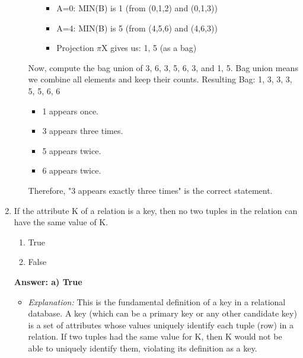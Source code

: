 \documentclass{article}
\begin{document}
\begin{enumerate}[label=\textbf{Question \arabic*.}]
\begin{itemize}
\begin{enumerate}
\begin{itemize}
                        \item A=0: MIN(B) is 1 (from (0,1,2) and (0,1,3))
                        \item A=4: MIN(B) is 5 (from (4,5,6) and (4,6,3))
                    \item Projection $\pi$X gives us: {1, 5} (as a bag)
                \end{itemize}
        \end{enumerate}
        Now, compute the bag union of {3, 6, 3}, {5, 6, 3}, and {1, 5}.
        Bag union means we combine all elements and keep their counts.
        Resulting Bag: {1, 3, 3, 3, 5, 5, 6, 6}
        \begin{itemize}
            \item 1 appears once.
            \item 3 appears three times.
            \item 5 appears twice.
            \item 6 appears twice.
        \end{itemize}
        Therefore, "3 appears exactly three times" is the correct statement.
    \end{itemize}

\item If the attribute K of a relation is a key, then no two tuples in the relation can have the same value of K.
    \begin{enumerate}[label=\alph*)]
        \item True
        \item False
    \end{enumerate}
    \textbf{Answer: a) True}
    \begin{itemize}
        \item \textit{Explanation:} This is the fundamental definition of a key in a relational database. A key (which can be a primary key or any other candidate key) is a set of attributes whose values uniquely identify each tuple (row) in a relation. If two tuples had the same value for K, then K would not be able to uniquely identify them, violating its definition as a key.
    \end{itemize}

\end{enumerate}
\end{document}
